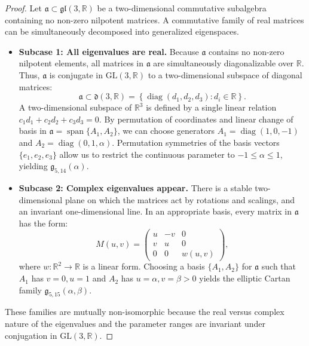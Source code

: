 \documentclass[11pt,a4paper]{article}
\theoremstyle{definition}
\theoremstyle{remark}
\newcommand{\R}{\mathbb{R}}
\newcommand{\g}{\mathfrak{g}}
\newcommand{\diag}{\operatorname{diag}}
\newcommand{\spanop}{\operatorname{span}}
\begin{document}
\begin{proof}
Let $\mathfrak{a} \subset \mathfrak{gl}(3, \R)$ be a two-dimensional commutative subalgebra containing no non-zero nilpotent matrices. A commutative family of real matrices can be simultaneously decomposed into generalized eigenspaces.
\begin{itemize}
    \item \textbf{Subcase 1: All eigenvalues are real.} Because $\mathfrak{a}$ contains no non-zero nilpotent elements, all matrices in $\mathfrak{a}$ are simultaneously diagonalizable over $\R$. Thus, $\mathfrak{a}$ is conjugate in $\mathrm{GL}(3, \R)$ to a two-dimensional subspace of diagonal matrices:
    \begin{equation}
        \mathfrak{a} \subset \mathfrak{d}(3, \R) = \left\{ \diag(d_1, d_2, d_3) : d_i \in \R \right\}.
    \end{equation}
    A two-dimensional subspace of $\R^3$ is defined by a single linear relation $c_1 d_1 + c_2 d_2 + c_3 d_3 = 0$. By permutation of coordinates and linear change of basis in $\mathfrak{a} = \spanop\{A_1, A_2\}$, we can choose generators $A_1 = \diag(1, 0, -1)$ and $A_2 = \diag(0, 1, \alpha)$. Permutation symmetries of the basis vectors $\{e_1, e_2, e_3\}$ allow us to restrict the continuous parameter to $-1 \le \alpha \le 1$, yielding $\g_{5,14}(\alpha)$.
    
    \item \textbf{Subcase 2: Complex eigenvalues appear.} There is a stable two-dimensional plane on which the matrices act by rotations and scalings, and an invariant one-dimensional line. In an appropriate basis, every matrix in $\mathfrak{a}$ has the form:
    \begin{equation}
        M(u, v) = \begin{pmatrix} u & -v & 0 \\ v & u & 0 \\ 0 & 0 & w(u, v) \end{pmatrix},
    \end{equation}
    where $w \colon \R^2 \to \R$ is a linear form. Choosing a basis $\{A_1, A_2\}$ for $\mathfrak{a}$ such that $A_1$ has $v=0, u=1$ and $A_2$ has $u=\alpha, v=\beta > 0$ yields the elliptic Cartan family $\g_{5,15}(\alpha, \beta)$.
\end{itemize}
These families are mutually non-isomorphic because the real versus complex nature of the eigenvalues and the parameter ranges are invariant under conjugation in $\mathrm{GL}(3, \R)$.
\end{proof}
\end{document}
